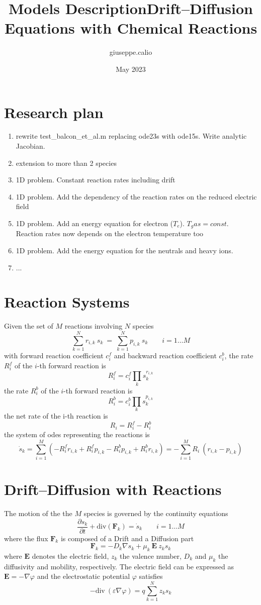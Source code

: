 \documentclass[11pt]{amsart}
\title{Models Description}
\author{giuseppe.calio }
\date{May 2023}
\title{Drift--Diffusion Equations with Chemical Reactions}
\begin{document}
\maketitle

\section{Research plan}
\begin{enumerate}
    \item rewrite test\_balcon\_et\_al.m replacing ode23s with ode15s. Write analytic Jacobian.
    \item extension to more than 2 species
    \item 1D problem. Constant reaction rates including drift
    \item 1D problem. Add the dependency of the reaction rates on the reduced electric field
    \item 1D problem. Add an energy equation for electron ($T_e$). $T_gas=const$. Reaction rates now depends on the electron temperature too
    \item 1D problem. Add the energy equation for the neutrals and heavy ions.
    \item ...
\end{enumerate}
\section{Reaction Systems}

Given the set of $M$ reactions involving $N$ species
\[
\sum_{k=1}^{N} r_{i,k}\ s_k\ =\ \sum_{k=1}^{N} p_{i,k}\ s_k \qquad  i=1\ldots M
\]
with forward reaction coefficient $c^f_i$ and backward reaction coefficient $c^b_i$,
the rate $R^{f}_i$ of the $i$-th forward reaction is 
$$
 R^{f}_i = c^{f}_i \prod_k s_k^{ r_{i,k} }
$$
the rate $R^{b}_i$ of the $i$-th forward reaction is 
$$
 R^{b}_i = c^{b}_i \prod_k s_k^{ p_{i,k} }
$$
the net rate of the i-th reaction is 
$$
R_i = R^{f}_i - R^{b}_i
$$
the system of odes representing the reactions is
$$
\dot{s}_k = \sum_{i=1}^M \left( - R^{f}_i r_{i,k} + R^{f}_i p_{i,k}
             - R^{b}_i p_{i,k} + R^{b}_i r_{i,k} \right) =
             - \sum_{i=1}^M  R_i\ (r_{i,k} - p_{i,k}) 
$$

\section{Drift--Diffusion with Reactions}

The motion of the the $M$ species is governed by the continuity equations
$$
\dfrac{\partial s_{k}}{\partial t} + \mathrm{div} \left( \mathbf{F}_{k} \right) = \dot{s}_k  \qquad  i=1\ldots M
$$
where the flux $\mathbf{F}_{k}$ is composed of a Drift and a Diffusion part
$$
\mathbf{F}_{k} = - D_{k} \nabla s_{k} + \mu_{k}\ \mathbf{E}\ z_{k} s_{k}
$$
where $\mathbf{E}$ denotes the electric field, $z_{k}$ the valence number, $D_{k}$ and $\mu_{k}$ 
the diffusivity and mobility, respectively.
The electric field can be expressed as $\mathbf{E} = - \nabla \varphi$ and the electrostatic potential $\varphi$ 
satisfies
$$
-\mathrm{div}\ \left( \varepsilon \nabla \varphi \right) = q \sum_{k=1}^{N} z_{k} s_{k}
$$
\end{document}

